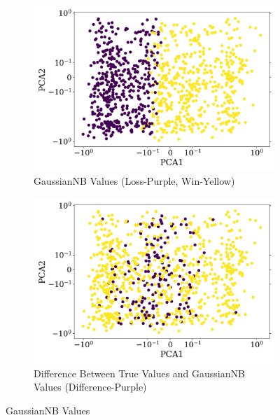 \documentclass{article}
\begin{document}
\begin{figure}[H]
    \centering
    \begin{subfigure}[t]{0.495\textwidth}
        \centering
        \includegraphics[width=\textwidth]{results/GaussianNB_Gauss_Week_6_With_RS_True.png}
        \caption{GaussianNB Values (Loss-Purple, Win-Yellow)}
        \label{fig:gaussiannb_values}
    \end{subfigure}
    \hfill
    \begin{subfigure}[t]{0.495\textwidth}
        \centering
        \includegraphics[width=\textwidth]{results/GaussianNB_Diff_Gauss_True_Week_6_With_RS_True.png}
        \caption{Difference Between True Values and GaussianNB Values (Difference-Purple)}
        \label{fig:diff_gaussiannb_true}
    \end{subfigure}
    \caption{GaussianNB Values}
    \label{fig:guassiannb_values_fig}
\end{figure}
\end{document}
